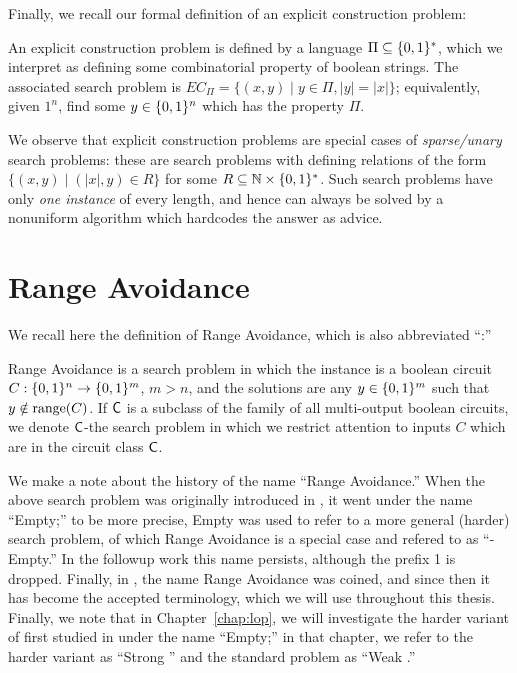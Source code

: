 Finally, we recall our formal definition of an explicit construction problem:
\begin{definition}
An explicit construction problem is defined by a language $\Pi \subseteq \{0,1\}^*$, which we interpret as defining some combinatorial property of boolean strings. The associated search problem is $EC_\Pi = \{(x,y) \mid y\in \Pi, |y|=|x|\}$; equivalently, given $1^n$, find some $y \in \{0,1\}^n$ which has the property $\Pi$. 
\end{definition}
We observe that explicit construction problems are special cases of \emph{sparse/unary} search problems: these are search problems with defining relations of the form $\{ (x, y) \mid (|x|, y) \in R\}$ for some $R \subseteq \mathbb{N} \times \{0,1\}^*$. Such search problems have only \emph{one instance} of every length, and hence can always be solved by a nonuniform algorithm which hardcodes the answer as advice.

\section{Range Avoidance}

We recall here the definition of Range Avoidance, which is also abbreviated ``\avoid:''
\begin{definition}
Range Avoidance is a search problem in which the instance is a boolean circuit $C: \{0,1\}^n\to \{0,1\}^m$, $ m> n$, and the solutions are any $y \in \{0,1\}^m$ such that $y \notin \mathrm{range}(C)$. If $\cl{C}$ is a subclass of the family of all multi-output boolean circuits, we denote $\cl{C}$-\avoid the search problem in which we restrict attention to inputs $C$ which are in the circuit class $\cl{C}$.
\end{definition}

We make a note about the history of the name ``Range Avoidance.'' When the above search problem was originally introduced in \cite{KKMP}, it went under the name ``{\sc Empty};'' to be more precise, {\sc Empty} was used to refer to a more general (harder) search problem, of which Range Avoidance is a special case and refered to as ``{-Empty}.'' In the followup work \cite{Korten21} this name persists, although the prefix 1 is dropped. Finally, in \cite{RSW}, the name Range Avoidance was coined, and since then it has become the accepted terminology, which we will use throughout this thesis. Finally, we note that in Chapter~\ref{chap:lop}, we will investigate the harder variant of \avoid first studied in \cite{KKMP} under the name ``{\sc Empty};'' in that chapter, we refer to the harder variant as ``Strong \avoid'' and the standard \avoid problem as ``Weak \avoid.''

